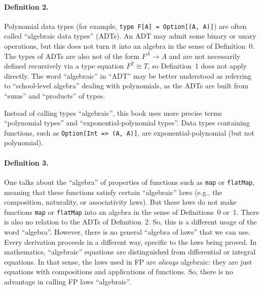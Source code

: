 \paragraph{Definition 2.}

Polynomial data types (for example, \lstinline!type F[A] = Option[(A, A)]!)
are often called \textquotedblleft algebraic data types\textquotedblright{}
(ADTs). An ADT may admit some binary or unary operations, but this
does not turn it into an algebra in the sense of Definition~0. The
types of ADTs are also not of the form $F^{A}\rightarrow A$ and are
not necessarily defined recursively via a type equation $F^{T}\cong T$,
so Definition~1 does not apply directly. The word \textsf{``}algebraic\textsf{''}
in \textsf{``}ADT\textsf{''} may be better understood as referring to \textsf{``}school-level
algebra\textsf{''} dealing with polynomials, as the ADTs are built from \textsf{``}sums\textsf{''}
and \textsf{``}products\textsf{''} of types. 

Instead of calling types \textsf{``}algebraic\textsf{''}, this book uses more precise
terms \textquotedblleft polynomial types\textquotedblright{} and \textquotedblleft exponential-polynomial
types\textquotedblright . Data types containing functions, such as
\lstinline!Option[Int => (A, A)]!, are exponential-polynomial (but
not polynomial).

\paragraph{Definition 3.}

One talks about the \textquotedblleft algebra\textquotedblright{}
of properties of functions such as \lstinline!map! or \lstinline!flatMap!,
meaning that these functions satisfy certain \textsf{``}algebraic\textsf{''} laws
(e.g., the composition, naturality, or associativity laws). But these
laws do not make functions \lstinline!map! or \lstinline!flatMap!
into an algebra in the sense of Definitions~0 or~1. There is also
no relation to the ADTs of Definition~2. So, this is a different
usage of the word \textsf{``}algebra\textsf{''}. However, there is no general \textsf{``}algebra
of laws\textsf{''} that we can use. Every derivation proceeds in a different
way, specific to the laws being proved. In mathematics, \textsf{``}algebraic\textsf{''}
equations are distinguished from differential or integral equations.
In that sense, the laws used in FP are \emph{always} algebraic: they
are just equations with compositions and applications of functions.
So, there is no advantage in calling FP laws \textsf{``}algebraic\textsf{''}. 


